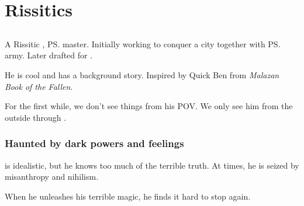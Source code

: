 \chapter{Rissitics}
\section{\Dzasselid}
A Rissitic \Shessefkesad{}, \ps{\Shilred}{} master. Initially working to conquer a \Scyric{} city together with \ps{\Narkiza}{} army. Later drafted for . 

He is cool and has a background story. Inspired by Quick Ben from \emph{Malazan Book of the Fallen}. 

For the first while, we don't see things from his POV. We only see him from the outside through \Shilred. 









\subsection{Haunted by dark powers and feelings}
\Dzasselid{} is idealistic, but he knows too much of the terrible truth. 
At times, he is seized by misanthropy and nihilism. 


When he unleashes his terrible magic, he finds it hard to stop again. 
















